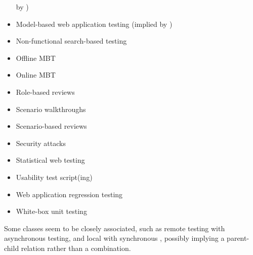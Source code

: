 \begin{itemize}
            by \citealp[p.~356]{SakamotoEtAl2013})
      \item Model-based web application testing (implied by
            \citealp[p.~356]{SakamotoEtAl2013})
      \item Non-functional search-based testing \citep[Tab.~1]{DoğanEtAl2014}
      \item Offline MBT \citepISTQB{}
      \item Online MBT \citepISTQB{}
      \item Role-based reviews \citepISTQB{}
      \item Scenario walkthroughs \citep[Fig.~4]{Gerrard2000a}
      \item Scenario-based reviews \citepISTQB{}
      \item Security attacks \citepISTQB{}
      \item Statistical web testing \citep[p.~185]{DoğanEtAl2014}
      \item Usability test script(ing) \citepISTQB{}
      \item Web application regression testing \cite[Tab.~21]{DoğanEtAl2014}
      \item White-box unit testing \citep[pp.~345-346]{SakamotoEtAl2013}
\end{itemize}

Some classes seem to be closely associated, such as remote testing
with asynchronous testing, and local with synchronous \citep{JardEtAl1999},
possibly implying a parent-child relation rather than a combination.
